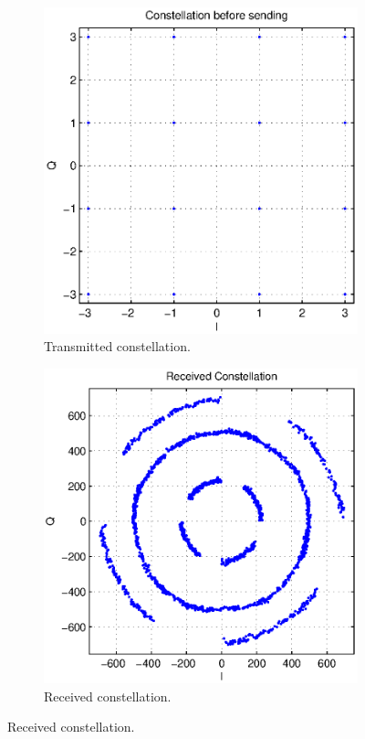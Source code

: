 \documentclass[12pt,a4paper,openright]{article}
\begin{document}
 \begin{figure}[h]
 \centering
\begin{subfigure}{0.32\textwidth}
 \centering
    \includegraphics[width=0.8\linewidth]{tx_const.eps}
    \caption{Transmitted constellation.}
    \label{fig:DPLL2}
\end{subfigure}%
\begin{subfigure}{0.32\textwidth}
 \centering
    \includegraphics[width=0.8\linewidth]{rx_const.eps}
    \caption{Received constellation.}
    \label{fig:PD2}
    \end{subfigure}

\end{figure}
\end{document}
